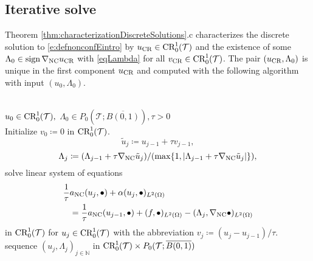 \subsection{Iterative solve}
Theorem
\ref{thm:characterizationDiscreteSolutions}.c
characterizes the discrete solution to  
\eqref{e:defnonconfEintro} 
by $u_{\textup{CR}}\in\textup{CR}^1_0(\mathcal T)$ and 
the existence of some 
$
  \Lambda_0\in\operatorname{sign}\nabla_{\textup{NC}}u_{\textup{CR}}
$ 
with \eqref{eqLambda}
for all $v_{\textup{CR}}\in\textup{CR}^1_0(\mathcal{T})$.
The pair $(u_\textup{CR},\Lambda_0)$ is unique in the first component $u_\textup{CR}$
and computed with the following algorithm with input $(u_0,\Lambda_0)$.


\begin{algorithm}\label{alg:PrimalDualIteration}
\begin{algorithmic}\\
  \Require $u_0\in\textup{CR}_0^1(\mathcal{T}),$
  $\Lambda_0\in P_0(\mathcal{T};
  \overline{B(0,1)}),\tau>0$  \\
  Initialize $v_0\coloneqq 0$ in $\textup{CR}^1_0(\mathcal T)$.
  \begin{equation}
    \label{equ:PrimalDualAlgUj}
    \tilde{u}_j\coloneqq u_{j-1}+\tau v_{j-1},
  \end{equation}
  \begin{equation}
    \label{equ:PrimalDualAlgLambdaJ}
    \Lambda_j\coloneqq
    (\Lambda_{j-1}+\tau\nabla_{\textup{NC}} \tilde{u}_j)/
      (\operatorname{max}\{1,|\Lambda_{j-1}+\tau\nabla_{\textup{NC}}\tilde{u}_j|\}),
  \end{equation}
      \State
  \State solve linear system of equations
  \begin{align}
    \label{equ:linSysPrimalDualAlg}
    \frac{1}{\tau}&a_{\textup{NC}}(u_j,\bullet)+\alpha(u_j,\bullet)_{L^2(\Omega)}
    \notag \\
    &=
    \frac{1}{\tau}a_{\textup{NC}}(u_{j-1},\bullet) + (f,\bullet)_{L^2(\Omega)}
    - (\Lambda_j,\nabla_{\textup{NC}}\bullet)_{L^2(\Omega)} 
  \end{align}
in $\textup{CR}^1_0(\mathcal{T})$ for $u_j\in\textup{CR}^1_0(\mathcal{T})$
with the abbreviation
$v_j\coloneqq(u_j-u_{j-1})/\tau$.\\
  \EndFor
  \Ensure sequence $(u_j,\Lambda_j)_{j\in\mathbb N}$ in $\textup{CR}^1_0(\mathcal{T})\times
  P_0(\mathcal{T};\overline{B(0,1)})$   
  \end{algorithmic}
\end{algorithm}

